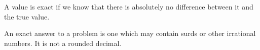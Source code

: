 A value is exact if we know that there is absolutely no difference between
it and the true value.
\par
An exact answer to a problem is one which may contain
surds or other irrational numbers. It is not a rounded 
decimal.
